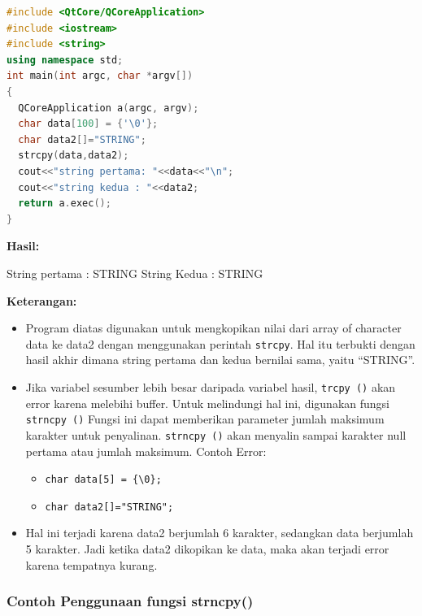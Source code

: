 \begin{lstlisting}[language=c++, caption=Penggunaan fungsi strcpy(), label=contoh3-21]
#include <QtCore/QCoreApplication>
#include <iostream>
#include <string>
using namespace std;
int main(int argc, char *argv[])
{
  QCoreApplication a(argc, argv);
  char data[100] = {'\0'};
  char data2[]="STRING";
  strcpy(data,data2);
  cout<<"string pertama: "<<data<<"\n";
  cout<<"string kedua : "<<data2;
  return a.exec();
}
\end{lstlisting}

\textbf{Hasil:}
\begin{lcverbatim}
String pertama : STRING
String Kedua : STRING
\end{lcverbatim}


\textbf{Keterangan:}

\begin{itemize}
\item
  Program diatas digunakan untuk mengkopikan nilai dari array of
  character data ke data2 dengan menggunakan perintah \texttt{strcpy}.
  Hal itu terbukti dengan hasil akhir dimana string pertama dan kedua
  bernilai sama, yaitu ``STRING''.
\item
  Jika variabel sesumber lebih besar daripada variabel hasil,
  \texttt{trcpy\ ()} akan error karena melebihi buffer. Untuk melindungi
  hal ini, digunakan fungsi \texttt{strncpy\ ()} Fungsi ini dapat
  memberikan parameter jumlah maksimum karakter untuk penyalinan.
  \texttt{strncpy\ ()} akan menyalin sampai karakter null pertama atau
  jumlah maksimum. Contoh Error:

  \begin{itemize}
  
  \item
    \texttt{char\ data{[}5{]}\ =\ \{\textquotesingle{}\textbackslash{}0\textquotesingle{}\};}
  \item
    \texttt{char\ data2{[}{]}="STRING";}
  \end{itemize}
\item
  Hal ini terjadi karena data2 berjumlah 6 karakter, sedangkan data
  berjumlah 5 karakter. Jadi ketika data2 dikopikan ke data, maka akan
  terjadi error karena tempatnya kurang.
\end{itemize}

\subsubsection*{Contoh  Penggunaan fungsi strncpy()}

